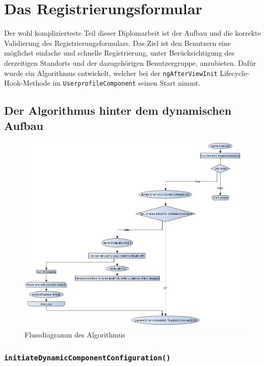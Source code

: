 \chapter{Das Registrierungsformular}

Der wohl komplizierteste Teil dieser Diplomarbeit ist der Aufbau und die korrekte Validierung des Registrierungsformulars. Das Ziel ist den Benutzern eine möglichst einfache und schnelle Registrierung, unter Berücksichtigung des derzeitigen Standorts und der dazugehörigen Benutzergruppe, anzubieten. Dafür wurde ein Algorithmus entwickelt, welcher bei der \texttt{ngAfterViewInit} Lifecycle-Hook-Methode im \texttt{UserprofileComponent} seinen Start nimmt.

\section{Der Algorithmus hinter dem dynamischen Aufbau}

\begin{figure}[H]
	\centerline{
		\includegraphics[width=1\textwidth, frame]{./grafiken/RF_Flussdiagramm.png}
	}
	\vskip0pt
	\caption{Flussdiagramm des Algorithmus}
	\label{fig:fc}
\end{figure}

\subsection{\texttt{initiateDynamicComponentConfiguration()}}

